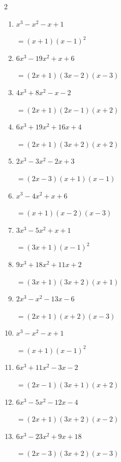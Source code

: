 \begin{multicols}{2}
\begin{enumerate}
        $=(2x+3)(x-1)(x-3)$

  \item $x^{3}-x^{2}-x+1$

        $=(x+1)(x-1) ^{ 2 }$

  \item $6x^{3}-19x^{2}+x+6$

        $=(2x+1)(3x-2)(x-3)$

  \item $4x^{3}+8x^{2}-x-2$

        $=(2x+1)(2x-1)(x+2)$

\columnbreak %

\resetques

  \item $6x^{3}+19x^{2}+16x+4$

        $=(2x+1)(3x+2)(x+2)$

  \item $2x^{3}-3x^{2}-2x+3$

        $=(2x-3)(x+1)(x-1)$

  \item $x^{3}-4x^{2}+x+6$

        $=(x+1)(x-2)(x-3)$

  \item $3x^{3}-5x^{2}+x+1$

        $=(3x+1)(x-1) ^{ 2 }$

  \item $9x^{3}+18x^{2}+11x+2$

        $=(3x+1)(3x+2)(x+1)$

\columnbreak %

  \item $2x^{3}-x^{2}-13x-6$

        $=(2x+1)(x+2)(x-3)$

  \item $x^{3}-x^{2}-x+1$

        $=(x+1)(x-1) ^{ 2 }$

  \item $6x^{3}+11x^{2}-3x-2$

        $=(2x-1)(3x+1)(x+2)$

  \item $6x^{3}-5x^{2}-12x-4$

        $=(2x+1)(3x+2)(x-2)$

  \item $6x^{3}-23x^{2}+9x+18$

        $=(2x-3)(3x+2)(x-3)$

\columnbreak %


\end{enumerate}
\end{multicols}
